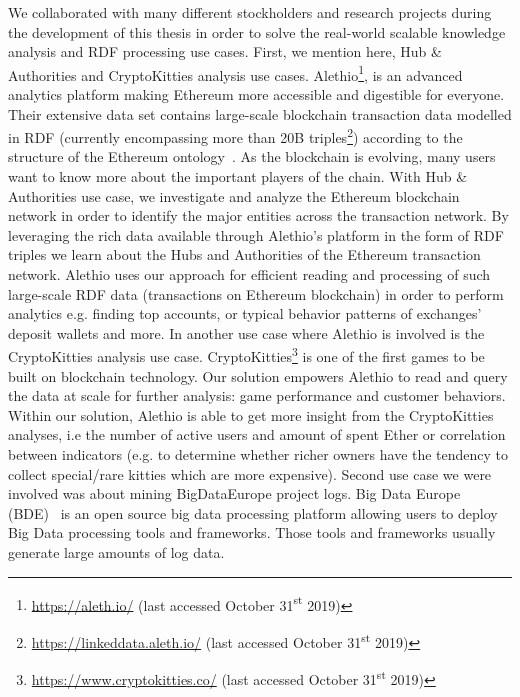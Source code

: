 \begin{enumerate}
    We collaborated with many different stockholders and research projects during the development of this thesis in order to solve the real-world scalable knowledge analysis and \gls{RDF} processing use cases.
    First, we mention here, Hub \& Authorities and CryptoKitties analysis use cases. 
    Alethio\footnote{\scriptsize \url{https://aleth.io/} (last accessed October 31{\textsuperscript{st}} 2019)}, is an advanced analytics platform making Ethereum more accessible and digestible for everyone.
    Their extensive data set contains large-scale blockchain transaction data modelled in \gls{RDF} (currently encompassing more than 20B triples\footnote{\scriptsize \url{https://linkeddata.aleth.io/} (last accessed October 31{\textsuperscript{st}} 2019)}) according to the structure of the Ethereum ontology~\cite{pfeffer2016ethon}.
    As the blockchain is evolving, many users want to know more about the important players of the chain. 
    With Hub \& Authorities use case, we investigate and analyze the Ethereum blockchain network in order to identify the major entities across the transaction network. 
    By leveraging the rich data available through Alethio's platform in the form of \gls{RDF} triples we learn about the Hubs and Authorities of the Ethereum transaction network.
    Alethio uses our approach for efficient reading and processing of such large-scale \gls{RDF} data (transactions on Ethereum blockchain) in order to perform analytics e.g. finding top accounts, or typical behavior patterns of exchanges' deposit wallets and more.
    In another use case where Alethio is involved is the CryptoKitties analysis use case.
    CryptoKitties\footnote{\url{https://www.cryptokitties.co/} (last accessed October 31{\textsuperscript{st}} 2019)} is one of the first games to be built on blockchain technology.
    Our solution empowers Alethio to read and query the data at scale for further analysis: game performance and customer behaviors.
    Within our solution, Alethio is able to get more insight from the CryptoKitties analyses, i.e the number of active users and amount of spent Ether or correlation between indicators (e.g. to determine whether richer owners have the tendency to collect special/rare kitties which are more expensive).
    Second use case we were involved was about mining BigDataEurope project logs.
    Big Data Europe (BDE)~\cite{Auer+ICWE-2017} is an open source big data processing platform allowing users to deploy Big Data processing tools and frameworks. 
    Those tools and frameworks usually generate large amounts of log data. 

\end{enumerate}
